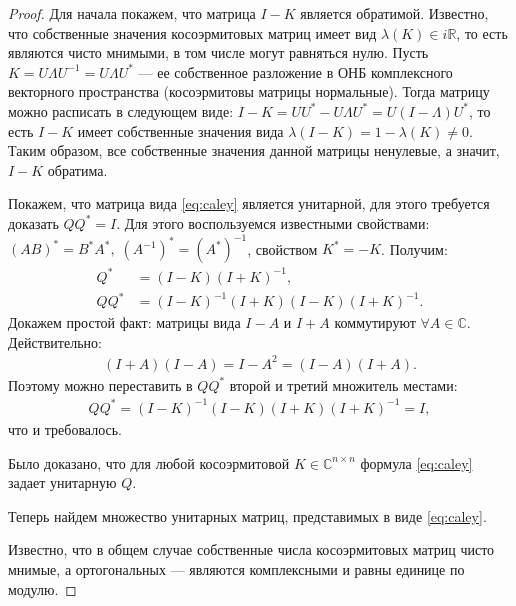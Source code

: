 \documentclass{article}
\newtheorem*{proof}{$\square$}
\newcommand{\R}{\mathbb{R}}
\renewcommand{\C}{\mathbb{C}}
\begin{document}
	\begin{proof}
		Для начала покажем, что матрица $I - K$ является обратимой. Известно, что собственные значения косоэрмитовых матриц имеет вид $\lambda(K) \in i\R$, то есть являются чисто мнимыми, в том числе могут равняться нулю. Пусть $K = U \Lambda U^{-1} = U \Lambda U^*$ --- ее собственное разложение в ОНБ комплексного векторного пространства (косоэрмитовы матрицы нормальные). Тогда матрицу можно расписать в следующем виде: $I - K = U U^* - U \Lambda U^* = U (I - \Lambda) U^*$, то есть $I - K$ имеет собственные значения вида $\lambda(I - K) = 1 - \lambda(K) \neq 0$. Таким образом, все собственные значения данной матрицы ненулевые, а значит, $I - K$ обратима.
		
		
		Покажем, что матрица вида \eqref{eq:caley} является унитарной, для этого требуется доказать $Q Q^* = I$. Для этого воспользуемся известными свойствами: $(AB)^*=B^*A^*,\; (A^{-1})^* = (A^*)^{-1}$, свойством $K^* = -K$. Получим:
		\begin{equation*}\begin{aligned}
				Q^* &= (I - K)(I + K)^{-1},\\
				Q Q^* &= (I - K)^{-1}(I + K)(I - K)(I + K)^{-1}.
		\end{aligned}\end{equation*}
		Докажем простой факт: матрицы вида $I - A$ и $I + A$ коммутируют $\forall A \in \C$. Действительно:
		\begin{equation*}\begin{aligned}
				(I + A)(I - A) = I - A^2 = (I - A)(I + A).
		\end{aligned}\end{equation*}
		Поэтому можно переставить в $Q Q^*$ второй и третий множитель местами:
		\begin{equation*}\begin{aligned}
				Q Q^* = (I - K)^{-1}(I - K)(I + K)(I + K)^{-1} = I, 
		\end{aligned}\end{equation*}
		что и требовалось.
		
		Было доказано, что для любой косоэрмитовой $K \in \C^{n\times n} $ формула \eqref{eq:caley} задает унитарную $Q$.
		
		Теперь найдем множество унитарных матриц, представимых в виде \eqref{eq:caley}.
		
		Известно, что в общем случае собственные числа косоэрмитовых матриц чисто мнимые, а ортогональных --- являются комплексными и равны единице по модулю.
		

\end{proof}
\end{document}

